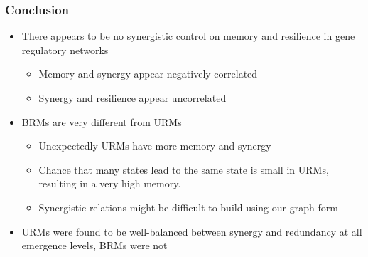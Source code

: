 \documentclass[hyperref={pdfpagelabels=false}]{beamer}
\begin{document}
\begin{frame}
\frametitle{Conclusion}
\begin{itemize}
\item There appears to be no synergistic control on memory and resilience in gene regulatory networks
\begin{itemize}
\item Memory and synergy appear negatively correlated
\item Synergy and resilience appear uncorrelated
\end{itemize}
\item BRMs are very different from URMs
\begin{itemize}
\item Unexpectedly URMs have more memory and synergy
\item Chance that many states lead to the same state is small in URMs, resulting in a very high memory.
\item Synergistic relations might be difficult to build using our graph form
\end{itemize}
\item URMs were found to be well-balanced between synergy and redundancy at all emergence levels, BRMs were not
\end{itemize}
\end{frame}
\end{document}
